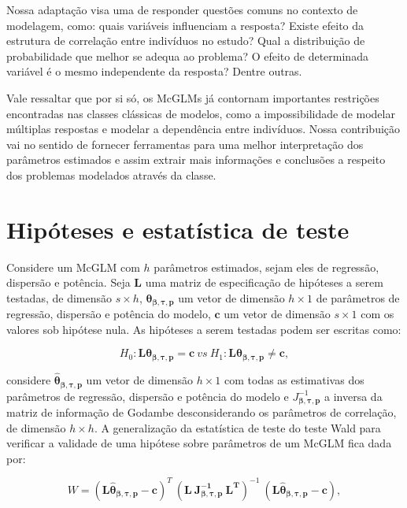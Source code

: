 Nossa adaptação visa uma de responder questões comuns no contexto de modelagem, como: quais variáveis influenciam a resposta? Existe efeito da estrutura de correlação entre indivíduos no estudo? Qual a distribuição de probabilidade que melhor se adequa ao problema? O efeito de determinada variável é o mesmo independente da resposta? Dentre outras.

Vale ressaltar que por si só, os McGLMs já contornam importantes restrições encontradas nas classes clássicas de modelos, como a impossibilidade de modelar múltiplas respostas e modelar a dependência entre indivíduos. Nossa contribuição vai no sentido de fornecer ferramentas para uma melhor interpretação dos parâmetros estimados e assim extrair mais informações e conclusões a respeito dos problemas modelados através da classe.

\section{Hipóteses e estatística de teste}\label{sec:subsection}

Considere um McGLM com $h$ parâmetros estimados, sejam eles de regressão, dispersão e potência. Seja $\boldsymbol{L}$ uma matriz de especificação de hipóteses a serem testadas, de dimensão $s \times h$, $\boldsymbol{\theta_{\beta,\tau,p}}$ um vetor de dimensão $h \times 1$ de parâmetros de regressão, dispersão e potência do modelo, $\boldsymbol{c}$ um vetor de dimensão $s \times 1$ com os valores sob hipótese nula. As hipóteses a serem testadas podem ser escritas como:

\begin{equation}
\label{eq:hipoteses_wald}
H_0: \boldsymbol{L}\boldsymbol{\theta_{\beta,\tau,p}} = \boldsymbol{c} \ vs \ H_1: \boldsymbol{L}\boldsymbol{\theta_{\beta,\tau,p}} \neq \boldsymbol{c}, 
\end{equation}

\noindent considere $\boldsymbol{\hat\theta_{\beta,\tau,p}}$ um vetor de dimensão $h \times 1$ com todas as estimativas dos parâmetros de regressão, dispersão e potência do modelo e $J_{\boldsymbol{{\beta,\tau,p}}}^{-1}$ a inversa da matriz de informação de Godambe desconsiderando os parâmetros de correlação, de dimensão $h \times h$. A generalização da estatística de teste do teste Wald para verificar a validade de uma hipótese sobre parâmetros de um McGLM fica dada por:

\begin{equation}
W = (\boldsymbol{L\hat\theta_{\beta,\tau,p}} - \boldsymbol{c})^T \ (\boldsymbol{L \ J_{\boldsymbol{{\beta,\tau,p}}}^{-1} \ L^T})^{-1} \ (\boldsymbol{L\hat\theta_{\beta,\tau,p}} - \boldsymbol{c}),
\end{equation}

